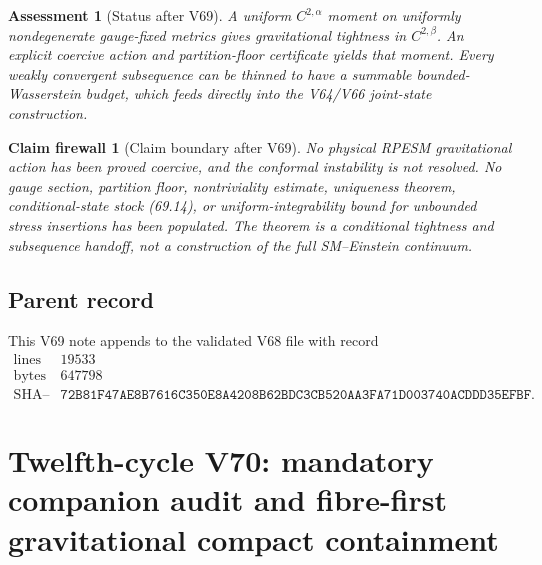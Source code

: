 \documentclass[11pt]{article}
\newtheorem{firewall}[theorem]{Claim firewall}
\newtheorem{assessment}[theorem]{Assessment}
\theoremstyle{remark}
\begin{document}
\begin{assessment}[Status after V69]
\label{ass:v12v69-status}
A uniform \(C^{2,\alpha}\) moment on uniformly nondegenerate
gauge-fixed metrics gives gravitational tightness in
\(C^{2,\beta}\).  An explicit coercive action and partition-floor
certificate yields that moment.  Every weakly convergent subsequence
can be thinned to have a summable bounded-Wasserstein budget, which
feeds directly into the V64/V66 joint-state construction.
\end{assessment}

\begin{firewall}[Claim boundary after V69]
\label{fire:v12v69-claim}
No physical RPESM gravitational action has been proved coercive, and
the conformal instability is not resolved.  No gauge section,
partition floor, nontriviality estimate, uniqueness theorem,
conditional-state stock (69.14), or uniform-integrability bound for
unbounded stress insertions has been populated.  The theorem is a
conditional tightness and subsequence handoff, not a construction of
the full SM--Einstein continuum.
\end{firewall}

\subsection{Parent record}

This V69 note appends to the validated V68 file with record
\[
\begin{array}{c|c}
\text{lines}&19533\\
\text{bytes}&647798\\
\text{SHA--256}&
\texttt{72B81F47AE8B7616C350E8A4208B62BDC3CB520AA3FA71D003740ACDDD35EFBF}.
\end{array}
\]


\section{Twelfth-cycle V70: mandatory companion audit and
fibre-first gravitational compact containment}
\label{sec:v12v70}
\end{document}
